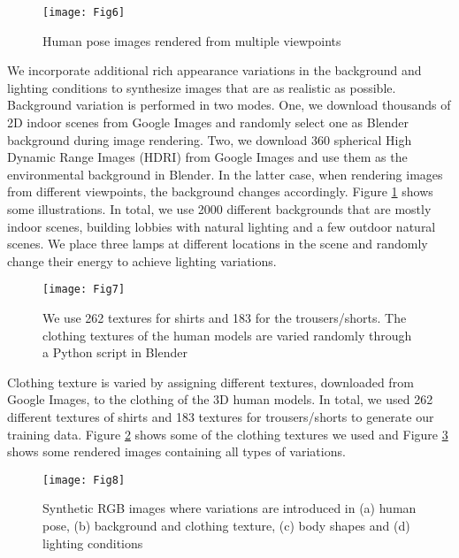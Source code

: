 \documentclass[twocolumn]{svjour3}          \smartqed  \usepackage{graphicx}
\begin{document}
\begin{figure}[t]
\centering
\texttt{[image: Fig6]}
\caption{Human pose images rendered from multiple viewpoints}
\label{fig:view_variance}
\vspace{-1mm}
\end{figure}

\vspace{2mm}
 We incorporate additional rich appearance variations in the background and lighting conditions to synthesize images that are as realistic as possible. Background variation is performed in two modes. One, we download thousands of 2D indoor scenes from Google Images and randomly select one as Blender background during image rendering. Two,  we download 360 spherical High Dynamic Range Images (HDRI) from Google Images and use them as the environmental background in Blender. In the latter case, when rendering images from different viewpoints, the background changes accordingly. Figure \ref{fig:view_variance} shows some illustrations. In total, we use 2000 different backgrounds that are mostly indoor scenes, building lobbies with natural lighting and a few outdoor natural scenes. We place three lamps at different locations in the scene and randomly change their energy to achieve lighting variations.

\begin{figure}[t]
\centering
\texttt{[image: Fig7]}
\caption{We use 262 textures for shirts and 183 for the trousers/shorts. The clothing textures of the human models are varied randomly through a Python script in Blender}
\label{fig:clothing}
\end{figure}

\vspace{2mm}
 Clothing texture is varied by assigning different textures, downloaded from Google Images, to the clothing of the 3D human models. In total, we used 262 different textures of shirts and 183 textures for trousers/shorts to generate our training data. Figure \ref{fig:clothing} shows some of the clothing textures we used and Figure \ref{fig:all_variances} shows some rendered images containing all types of variations.

\begin{figure}[t]
\centering
\texttt{[image: Fig8]}
\caption{Synthetic RGB images where variations are introduced in (a) human pose, (b) background and clothing texture, (c) body shapes and (d) lighting conditions}
\label{fig:all_variances}
\end{figure}
\end{document}
